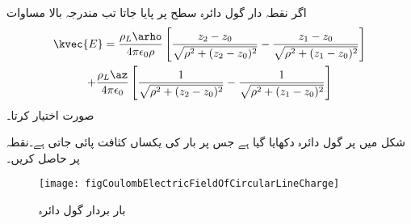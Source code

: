 اگر نقطہ دار گول دائرہ  سطح پر پایا جاتا تب مندرجہ بالا مساوات 
\begin{multline*}
\kvec{E}=\frac{\rho_L \arho}{4\pi\epsilon_0 \rho} \left[\frac{z_2-z_0}{\sqrt{\rho^2+(z_2-z_0)^2}}-\frac{z_1-z_0}{\sqrt{\rho^2+(z_1-z_0)^2}}\right]  \\+\frac{\rho_L \az}{4\pi\epsilon_0 } \left[\frac{1}{\sqrt{\rho^2+(z_2-z_0)^2}}-\frac{1}{\sqrt{\rho^2+(z_1-z_0)^2}} \right]
\end{multline*}
صورت اختیار کرتا۔

شکل  میں  پر گول دائرہ دکھایا گیا ہے جس پر بار کی یکساں کثافت پائی جاتی ہے۔نقطہ  پر  حاصل کریں۔

\begin{figure}
\centering
\texttt{[image: figCoulombElectricFieldOfCircularLineCharge]}
\caption{بار بردار گول دائرہ}
\label{شکل_کولمب_گول_دائرے_پر_بار}
\end{figure}

